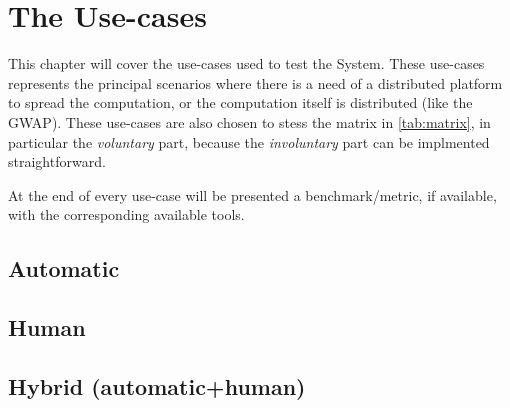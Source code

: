 
\chapter{The Use-cases}
\label{cap:cases}






This chapter will cover the use-cases used to test the System. These use-cases
represents the principal scenarios where there is a need of a distributed
platform to spread the computation, or the computation itself is distributed
(like the \ac{GWAP}). These use-cases are also chosen to stess the matrix in
\autoref{tab:matrix}, in particular the \emph{voluntary} part, because the
\emph{involuntary} part can be implmented straightforward.

At the end of every use-case will be presented a benchmark/metric, if available,
with the corresponding available tools.



\section{Automatic}
\label{sec:cases:automatic}


\section{Human}
\label{sec:cases:human}



\section{Hybrid (automatic+human)}
\label{sec:cases:hybrid}

